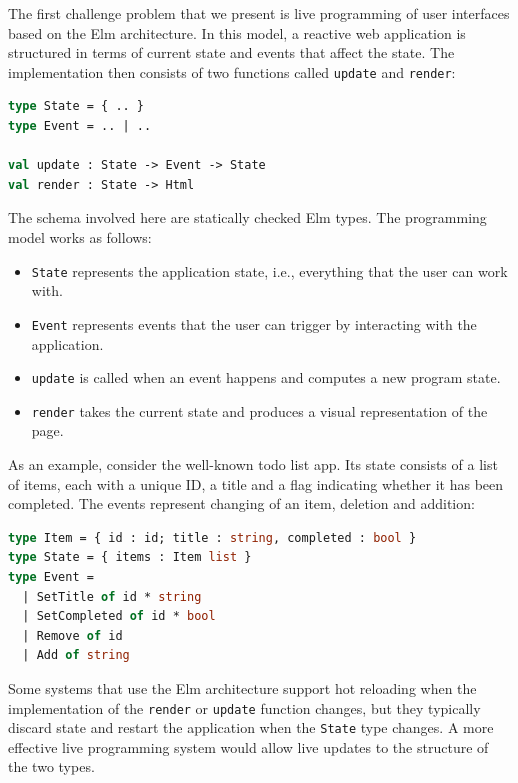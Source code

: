 \documentclass[english,crc]{programming}
\begin{document}
The first challenge problem that we present is live programming
of user interfaces based on the Elm architecture. In this model, a reactive web application is
structured in terms of current state and events that affect the state. The implementation then
consists of two functions called \texttt{update} and \texttt{render}:

\begin{lstlisting}[language=ml,morekeywords={on}]
type State = { .. }
type Event = .. | ..

val update : State -> Event -> State
val render : State -> Html
\end{lstlisting}

\noindent
The schema involved here are statically checked Elm types. The programming model works as follows:

\begin{itemize}
\setlength\itemsep{0em}
\item \texttt{State} represents the application state, i.e., everything that the user can work with.
\item \texttt{Event} represents events that the user can trigger by interacting with the application.
\item \texttt{update} is called when an event happens and computes a new program state.
\item \texttt{render} takes the current state and produces a visual representation of the page.
\end{itemize}

\noindent
As an example, consider the well-known todo list app. Its state consists of a list of items,
each with a unique ID, a title and a flag indicating whether it has been completed.
The events represent changing of an item, deletion and addition:

\begin{lstlisting}[language=ml]
type Item = { id : id; title : string, completed : bool }
type State = { items : Item list }
type Event =
  | SetTitle of id * string
  | SetCompleted of id * bool
  | Remove of id
  | Add of string
\end{lstlisting}

\noindent
Some systems that use the Elm architecture support hot reloading when the
implementation of the \texttt{render} or \texttt{update} function changes, but they typically
discard state and restart the application when the \texttt{State} type changes. A more effective
live programming system would allow live updates to the structure of the two types.
\end{document}
